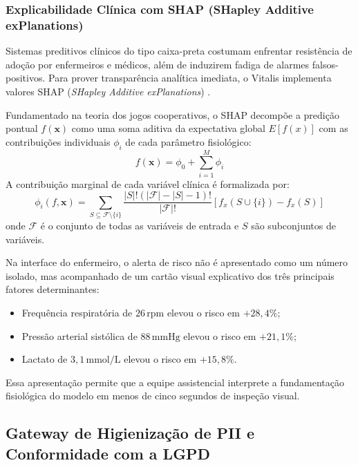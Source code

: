 \subsubsection{Explicabilidade Clínica com SHAP (SHapley Additive exPlanations)}
Sistemas preditivos clínicos do tipo caixa-preta costumam enfrentar resistência de adoção por enfermeiros e médicos, além de induzirem fadiga de alarmes falsos-positivos. Para prover transparência analítica imediata, o Vitalis implementa valores SHAP (\textit{SHapley Additive exPlanations}) \cite{lundberg_shap:2017}.

Fundamentado na teoria dos jogos cooperativos, o SHAP decompõe a predição pontual $f(\mathbf{x})$ como uma soma aditiva da expectativa global $E[f(x)]$ com as contribuições individuais $\phi_i$ de cada parâmetro fisiológico:
\begin{equation}
    f(\mathbf{x}) = \phi_0 + \sum_{i=1}^{M} \phi_i
\end{equation}
A contribuição marginal de cada variável clínica é formalizada por:
\begin{equation}
    \phi_i(f, \mathbf{x}) = \sum_{S \subseteq \mathcal{F} \setminus \{i\}} \frac{|S|!(|\mathcal{F}| - |S| - 1)!}{|\mathcal{F}|!} \left[ f_x(S \cup \{i\}) - f_x(S) \right]
\end{equation}
onde $\mathcal{F}$ é o conjunto de todas as variáveis de entrada e $S$ são subconjuntos de variáveis.

Na interface do enfermeiro, o alerta de risco não é apresentado como um número isolado, mas acompanhado de um cartão visual explicativo dos três principais fatores determinantes:
\begin{itemize}[noitemsep]
    \item Frequência respiratória de $26\,\text{rpm}$ elevou o risco em $+28{,}4\%$;
    \item Pressão arterial sistólica de $88\,\text{mmHg}$ elevou o risco em $+21{,}1\%$;
    \item Lactato de $3{,}1\,\text{mmol/L}$ elevou o risco em $+15{,}8\%$.
\end{itemize}
Essa apresentação permite que a equipe assistencial interprete a fundamentação fisiológica do modelo em menos de cinco segundos de inspeção visual.

\subsection{Gateway de Higienização de PII e Conformidade com a LGPD}
\label{subsec:ia_gateway_pii}

